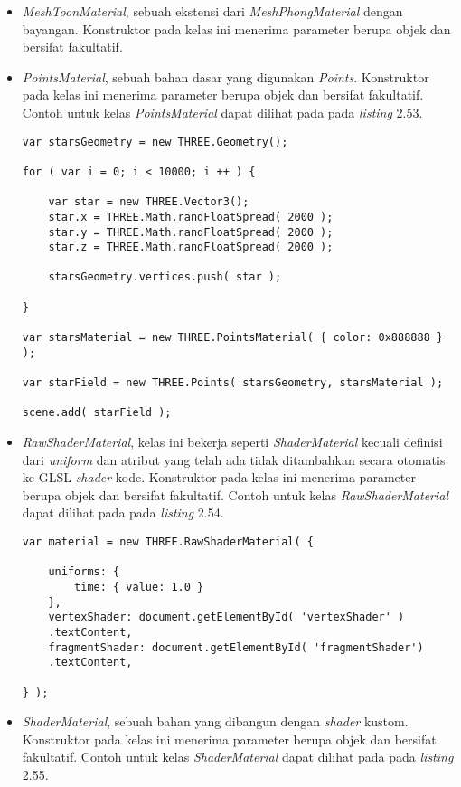 \begin{itemize}
\begin{itemize}
	\item {\it MeshToonMaterial}, sebuah ekstensi dari {\it MeshPhongMaterial} dengan bayangan. Konstruktor pada kelas ini menerima parameter berupa objek dan bersifat fakultatif.
	
	\item {\it PointsMaterial}, sebuah bahan dasar yang digunakan {\it Points}. Konstruktor pada kelas ini menerima parameter berupa objek dan bersifat fakultatif. Contoh untuk kelas {\it PointsMaterial} dapat dilihat pada pada {\it listing} 2.53.
	
\begin{lstlisting}[caption={Contoh penggunaan kelas {\it PointsMaterial}.},captionpos=b]
var starsGeometry = new THREE.Geometry();

for ( var i = 0; i < 10000; i ++ ) {

	var star = new THREE.Vector3();
	star.x = THREE.Math.randFloatSpread( 2000 );
	star.y = THREE.Math.randFloatSpread( 2000 );
	star.z = THREE.Math.randFloatSpread( 2000 );

	starsGeometry.vertices.push( star );

}

var starsMaterial = new THREE.PointsMaterial( { color: 0x888888 } );

var starField = new THREE.Points( starsGeometry, starsMaterial );

scene.add( starField );
\end{lstlisting}

	\item {\it RawShaderMaterial}, kelas ini bekerja seperti {\it ShaderMaterial} kecuali definisi dari {\it uniform} dan atribut yang telah ada tidak ditambahkan secara otomatis ke GLSL {\it shader} kode. Konstruktor pada kelas ini menerima parameter berupa objek dan bersifat fakultatif. Contoh untuk kelas {\it RawShaderMaterial} dapat dilihat pada pada {\it listing} 2.54.
	
\begin{lstlisting}[caption={Contoh penggunaan kelas {\it RawShaderMaterial}.},captionpos=b]
var material = new THREE.RawShaderMaterial( {

    uniforms: {
        time: { value: 1.0 }
    },
    vertexShader: document.getElementById( 'vertexShader' )
    .textContent,
    fragmentShader: document.getElementById( 'fragmentShader')
    .textContent,

} );
\end{lstlisting}

	\item {\it ShaderMaterial}, sebuah bahan yang dibangun dengan {\it shader} kustom. Konstruktor pada kelas ini menerima parameter berupa objek dan bersifat fakultatif. Contoh untuk kelas {\it ShaderMaterial} dapat dilihat pada pada {\it listing} 2.55.
	

\end{itemize}
\end{itemize}
